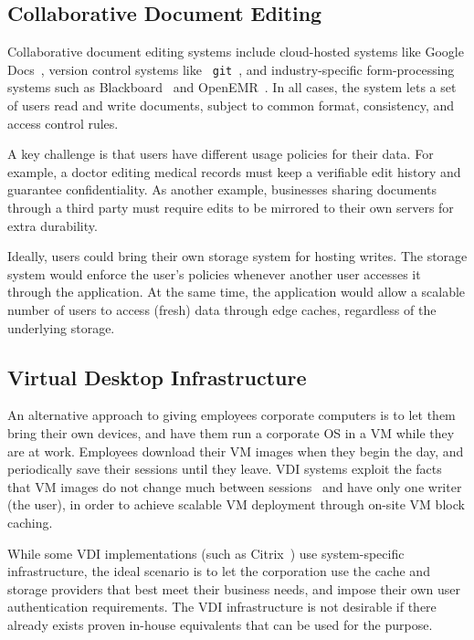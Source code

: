 \subsection{Collaborative Document Editing}

Collaborative document editing systems include cloud-hosted systems
like Google Docs~\cite{google-docs}, version control systems like {\tt
  git}~\cite{git}, and industry-specific form-processing systems such
as Blackboard~\cite{blackboard} and OpenEMR~\cite{openemr}.  In all
cases, the system lets a set of users read and write 
documents, subject to common format, consistency, and access control rules.

A key challenge is that users have different usage policies for their 
data.  For example, a doctor editing
medical records must keep a verifiable edit history and guarantee
confidentiality.  As another example, businesses sharing documents
through a third party must require edits to be mirrored to their own
servers for extra durability.

Ideally, users could bring their own storage system for hosting
writes.  The storage system would enforce the user's policies whenever
another user accesses it through the application.  At the same time,
the application would allow a scalable number of users to access
(fresh) data through edge caches, regardless of the underlying
storage.

\subsection{Virtual Desktop Infrastructure}

An alternative approach to giving employees corporate computers is to
let them bring their own devices, and have them run a corporate OS in
a VM while they are at work.  Employees download their VM images when
they begin the day, and periodically save their sessions until they
leave.  VDI systems exploit the facts that VM images do not change
much between sessions~\cite{collective} and have only one writer (the
user), in order to achieve scalable VM deployment through on-site VM
block caching.

While some VDI implementations (such as Citrix~\cite{citrix}) use system-specific
infrastructure, the ideal scenario is to let the corporation use the
cache and storage providers that best meet their business needs, and
impose their own user authentication requirements.  The VDI
infrastructure is not desirable if there already exists proven
in-house equivalents that can be used for the purpose.

